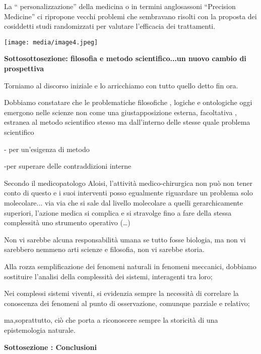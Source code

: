\documentclass[]{article}
\begin{document}
\begin{enumerate}
  La `` personalizzazione'' della medicina o in termini anglosassoni
  ``Precision Medicine'' ci ripropone vecchi problemi che sembravano
  risolti con la proposta dei cosiddetti studi randomizzati per valutare
  l'efficacia dei trattamenti.

  \texttt{[image: media/image4.jpeg]}

  \textbf{Sottosottosezione: filosofia e metodo scientifico...un nuovo
  cambio di prospettiva}

  Torniamo al discorso iniziale e lo arricchiamo con tutto quello detto
  fin ora.

  Dobbiamo constatare che le problematiche filosofiche , logiche e
  ontologiche oggi emergono nelle scienze non come una giustapposizione
  esterna, facoltativa , estranea al metodo scientifico stesso ma
  dall'interno delle stesse quale problema scientifico

  - per un'esigenza di metodo

  -per superare delle contraddizioni interne

  Secondo il medicopatologo Aloisi, l'attività medico-chirurgica non può
  non tener conto di questo e i suoi interventi posso egualmente
  riguardare un problema solo molecolare... via via che si sale dal
  livello molecolare a quelli gerarchicamente superiori, l'azione medica
  si complica e si stravolge fino a fare della stessa complessità uno
  strumento operativo (\ldots{})

  Non vi sarebbe alcuna responsabilità umana se tutto fosse biologia, ma
  non vi sarebbero nemmeno arti scienze e filosofia, non vi sarebbe
  storia.

  Alla rozza semplificazione dei fenomeni naturali in fenomeni
  meccanici, dobbiamo sostituire l'analisi della complessità dei
  sistemi, interagenti tra loro;

  Nei complessi sistemi viventi, si evidenzia sempre la necessità di
  correlare la conoscenza dei fenomeni al punto di osservazione,
  comunque parziale e relativo;

  ma,soprattutto, ciò che porta a riconoscere sempre la storicità di una
  epistemologia naturale.

  \textbf{Sottosezione : Conclusioni}
\end{enumerate}
\end{document}
